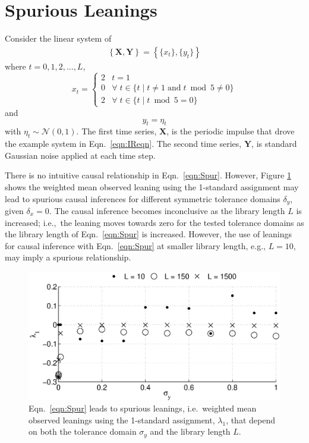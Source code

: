 \documentclass[twocolumn,aps,pre,groupedaddress]{revtex4-1}
\begin{document}
\section{Spurious Leanings}
Consider the linear system of
\begin{eqnarray}
\label{eqn:Spur}
\left\{\mathbf{X},\mathbf{Y}\right\} = \left\{\{x_t\},\{y_t\}\right\}
\end{eqnarray}
where $t=0,1,2,\ldots,L$,
\begin{equation*}
x_t = \left\{
  \begin{array}{lr}
    2 & t = 1\\
    0 & \forall\; t\in\{t\;|\;t\neq 1 \;\mathrm{and}\; t\bmod 5 \neq 0\}\\
    2 & \forall\; t\in\{t\;|\;t\bmod 5 = 0\}
  \end{array}
\right.
\end{equation*}
and
\begin{equation*}
y_t = \eta_t
\end{equation*}
with $\eta_t\sim\mathcal{N}\left(0,1\right)$.  The first time series, $\mathbf{X}$, is the periodic impulse that drove the example system in Eqn.\ \ref{eqn:IReqn}.  The second time series, $\mathbf{Y}$, is standard Gaussian noise applied at each time step.  

There is no intuitive causal relationship in Eqn.\ \ref{eqn:Spur}.  However, Figure \ref{fig:nocause} shows the weighted mean observed leaning using the 1-standard assignment may lead to spurious causal inferences for different symmetric tolerance domains $\delta_y$, given $\delta_x = 0$.  The causal inference becomes inconclusive as the library length $L$ is increased; i.e.,\ the leaning moves towards zero for the tested tolerance domains as the library length of Eqn.\ \ref{eqn:Spur} is increased.  However, the use of leanings for causal inference with Eqn.\ \ref{eqn:Spur} at smaller library length, e.g., $L=10$, may imply a spurious relationship. 
\begin{figure}[ht]
\includegraphics[scale=0.40]{NoCauseplot.eps}
\caption{Eqn.\ \ref{eqn:Spur} leads to spurious leanings, i.e.\ weighted mean observed leanings using the 1-standard assignment, $\lambda_1$, that depend on both the tolerance domain $\sigma_y$ and the library length $L$.}
\label{fig:nocause}
\end{figure}
\end{document}

